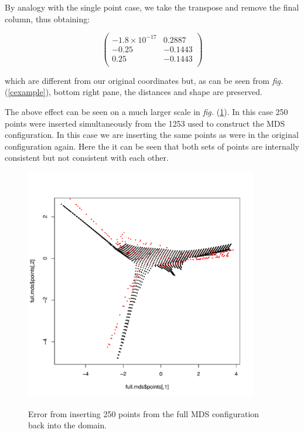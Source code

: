 \documentclass[a4paper,10pt]{article}
\newcommand{\fig}[1]{\emph{fig.} (\ref{#1})}
\newcommand{\cross}{\times}
\begin{document}
By analogy with the single point case, we take the transpose and remove the final column, thus obtaining:

\begin{equation*}
\begin{pmatrix}
-1.8\cross 10^{-17} &  0.2887\\
-0.25 & -0.1443\\
 0.25 & -0.1443\\
\end{pmatrix}
\end{equation*}

which are different from our original coordinates but, as can be seen from \fig{cexample}, bottom right pane, the distances and shape are preserved.

The above effect can be seen on a much larger scale in \fig{gowerfullinsert}. In this case 250 points were inserted simultaneously from the 1253 used to construct the MDS configuration. In this case we are inserting the same points as were in the original configuration again. Here the it can be seen that both sets of points are internally consistent but not consistent with each other.

\begin{figure}
\centering
\includegraphics[width=4in]{figs/wt2-gowererr-fullover.pdf} \\
\caption{Error from inserting 250 points from the full MDS configuration back into the domain.}
\label{gowerfullinsert}
\end{figure}
\end{document}
